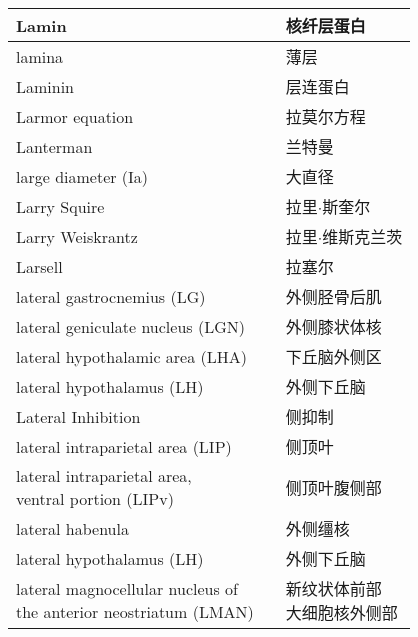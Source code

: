 \begin{longtable}{lll}
	\midrule
	Lamin     &&  核纤层蛋白  \\
	
	\midrule
	lamina     &&  薄层  \\
	
	\midrule
	Laminin     &&  层连蛋白  \\
	
	\midrule
	Larmor equation   && 拉莫尔方程  \\
	
	\midrule
	Lanterman     &&  兰特曼  \\
	
	\midrule
	large diameter (Ia)     &&  大直径  \\
	
	\midrule
	Larry Squire   && 拉里$\cdot$斯奎尔  \\
	
	\midrule
	Larry Weiskrantz   && 拉里$\cdot$维斯克兰茨  \\
	
	\midrule
	Larsell   && 拉塞尔  \\
	
	\midrule
	lateral gastrocnemius (LG)  && 外侧胫骨后肌  \\
	
	\midrule
	lateral geniculate nucleus (LGN)   && 外侧膝状体核  \\
	
	\midrule
	lateral hypothalamic area (LHA)  && 下丘脑外侧区  \\
	
	\midrule
	lateral hypothalamus (LH)  && 外侧下丘脑  \\
	
	\midrule
	Lateral Inhibition  && 侧抑制  \\
	
	\midrule
	lateral intraparietal area (LIP)   && 侧顶叶  \\
	
	\midrule
	\makecell[l]{lateral intraparietal area, \\ventral portion (LIPv)}   && 侧顶叶腹侧部  \\
	
	\midrule
	lateral habenula   && 外侧缰核  \\
	
	\midrule
	lateral	hypothalamus (LH)  && 外侧下丘脑  \\
	
	\midrule
	\makecell[l]{lateral magnocellular nucleus of \\ the anterior neostriatum (LMAN)}  && \makecell[l]{新纹状体前部\\大细胞核外侧部}  \\
	

\end{longtable}
